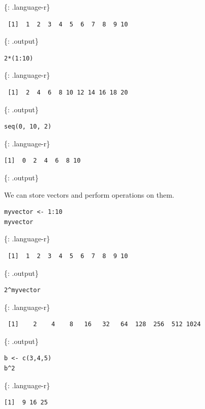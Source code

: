 \documentclass[]{article}
\begin{document}
\{: .language-r\}

\begin{verbatim}
 [1]  1  2  3  4  5  6  7  8  9 10
\end{verbatim}

\{: .output\}

\begin{verbatim}
2*(1:10)
\end{verbatim}

\{: .language-r\}

\begin{verbatim}
 [1]  2  4  6  8 10 12 14 16 18 20
\end{verbatim}

\{: .output\}

\begin{verbatim}
seq(0, 10, 2)
\end{verbatim}

\{: .language-r\}

\begin{verbatim}
[1]  0  2  4  6  8 10
\end{verbatim}

\{: .output\}

We can store vectors and perform operations on them.

\begin{verbatim}
myvector <- 1:10
myvector
\end{verbatim}

\{: .language-r\}

\begin{verbatim}
 [1]  1  2  3  4  5  6  7  8  9 10
\end{verbatim}

\{: .output\}

\begin{verbatim}
2^myvector
\end{verbatim}

\{: .language-r\}

\begin{verbatim}
 [1]    2    4    8   16   32   64  128  256  512 1024
\end{verbatim}

\{: .output\}

\begin{verbatim}
b <- c(3,4,5)
b^2
\end{verbatim}

\{: .language-r\}

\begin{verbatim}
[1]  9 16 25
\end{verbatim}
\end{document}
